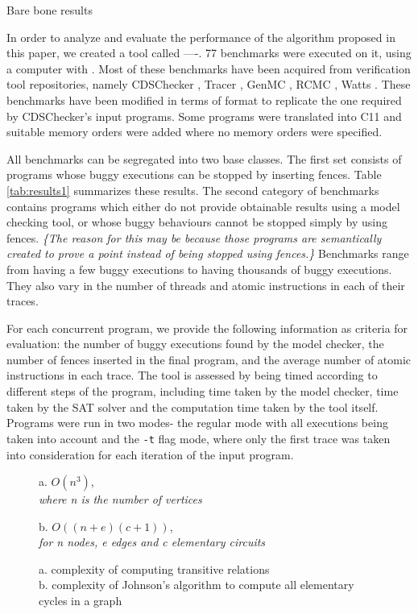 \begin{table}
		
	\caption{Bare bone results}
	\label{tab:results1}
\end{table}

In order to analyze and evaluate the performance of the algorithm 
proposed in this paper, we created a tool called ----. 77 benchmarks were
executed on it, using a computer with .
Most of these benchmarks have been acquired from verification tool
repositories, namely CDSChecker \cite{cds}, Tracer \cite{tracer2018},
GenMC \cite{genmc-PLDI19}, RCMC \cite{rcmc-POPL18}, Watts \cite{watts}.
These benchmarks have been modified in terms of format to replicate the
one required by CDSChecker's input programs.
Some programs were translated into C11 and suitable
memory orders were added where no memory orders were specified.

All benchmarks can be segregated into two base classes. The first set consists of 
programs whose buggy executions can be stopped by inserting fences. Table \ref{tab:results1}
summarizes these results. The second category of benchmarks contains programs which
either do not provide obtainable results using a model checking tool, or
whose buggy behaviours cannot be stopped simply by using fences. \textit{\{The reason
for this may be because those programs are semantically created to prove
a point instead of being stopped using fences.\}} Benchmarks range from
having a few buggy executions to having thousands of buggy executions. They
also vary in the number of threads and atomic instructions in each of
their traces.

For each concurrent program, we provide the following information as criteria for evaluation:
the number of buggy executions found by the model checker, the number of fences
inserted in the final program, and the average number of atomic instructions
in each trace. The tool is assessed by being timed according to different steps
of the program, including time taken by the model checker, time taken by the
SAT solver and the computation time taken by the tool itself. Programs
were run in two modes- the regular mode with all executions
being taken into account and the \texttt{-t} flag mode, where only the first
trace was taken into consideration for each iteration of the input program.

\begin{figure}
	a. $O(n^3)$, \\
	\textit{where n is the number of vertices}
	
	
	b. $O((n+e)(c+1))$, \\
	\textit{for n nodes, e edges and c elementary circuits}
	\caption{a. complexity of computing transitive \lhb relations\\
	b. complexity of Johnson's algorithm to compute all elementary cycles in a graph}
\end{figure}

